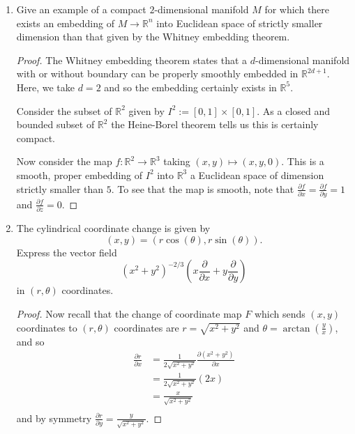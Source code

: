 \documentclass{article}
\begin{document}
\begin{enumerate}
	\item Give an example of a compact $2$-dimensional manifold $M$ for which there exists an embedding of $M \rightarrow \mathbb{R}^n$ into Euclidean space of strictly smaller dimension than that given by the Whitney embedding theorem.
	
	\begin{proof}
		The Whitney embedding theorem states that a $d$-dimensional manifold with or without boundary can be properly smoothly embedded in $\mathbb{R}^{2d+1}$. Here, we take $d=2$ and so the embedding certainly exists in $\mathbb{R}^5$.
		
		Consider the subset of $\mathbb{R}^2$ given by $I^2:=[0,1]\times [0,1]$. 
		As a closed and bounded subset of $\mathbb{R}^2$ the Heine-Borel theorem tells us this is certainly compact. 
		
		Now consider the map $f: \mathbb{R}^2 \rightarrow \mathbb{R}^3$ taking $(x,y) \mapsto (x,y,0)$. 
		This is a smooth, proper embedding of $I^2$ into $\mathbb{R}^3$ a Euclidean space of dimension strictly smaller than $5$.
		To see that the map is smooth, note that $\frac{\partial f}{\partial x} = \frac{\partial f}{\partial y} = 1$ and $\frac{\partial f}{\partial z} = 0$.
	\end{proof}
	
	
	\item The cylindrical coordinate change is given by \[(x,y) = ( r \cos (\theta), r \sin (\theta)).\]
	Express the vector field \[(x^2+y^2)^{-2/3} \left ( x \frac{\partial}{\partial x} + y \frac{\partial}{\partial y} \right) \]
	in $(r,\theta)$ coordinates.
	
	
	\begin{proof}

		
		Now recall that the change of coordinate map $F$ which sends $(x,y)$ coordinates to $(r, \theta)$ coordinates are $r = \sqrt{x^2+y^2}$ and $\theta = \arctan(\frac{y}{x})$, and so
		\begin{align*}
			\frac{\partial r}{\partial x} &= \frac{1}{2 \sqrt{x^2+y^2}} \frac{\partial (x^2+y^2)}{\partial x}\\
			&= \frac{1}{2 \sqrt{x^2+y^2}} (2x) \\
			&= \frac{x}{ \sqrt{x^2+y^2}} \\
		\end{align*}
		and by symmetry $\frac{\partial r}{\partial y} = \frac{y}{ \sqrt{x^2+y^2}} $.
		

\end{proof}
\end{enumerate}
\end{document}
